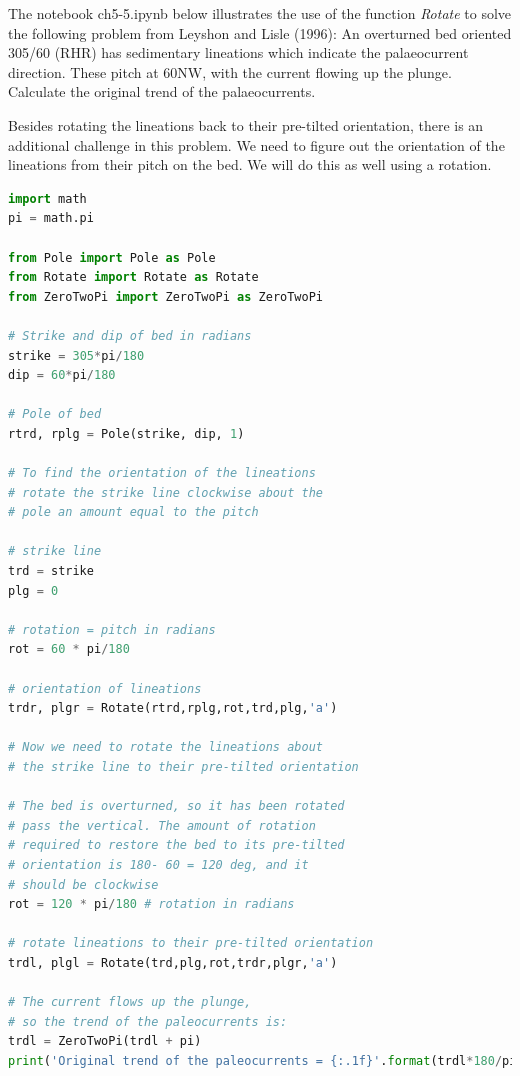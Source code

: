 \documentclass[a4paper , 12pt]{book}
\begin{document}
The  notebook  ch5-5.ipynb  below  illustrates  the  use  of  the  function \textit{Rotate} to solve the following problem from Leyshon  and Lisle  (1996): An overturned bed oriented 305/60 (RHR) has sedimentary lineations which indicate the palaeocurrent direction. These pitch at 60NW, with the current flowing up the plunge. Calculate the original trend of the palaeocurrents. 

Besides rotating the lineations back to their pre-tilted orientation, there is an additional challenge in this problem. We need to figure out the orientation of the lineations from their pitch on the bed. We will do this as well using a rotation.

\begin{center}
\begin{lstlisting}[language=Python, frame=single]
import math
pi = math.pi

from Pole import Pole as Pole
from Rotate import Rotate as Rotate
from ZeroTwoPi import ZeroTwoPi as ZeroTwoPi

# Strike and dip of bed in radians
strike = 305*pi/180
dip = 60*pi/180

# Pole of bed
rtrd, rplg = Pole(strike, dip, 1)

# To find the orientation of the lineations
# rotate the strike line clockwise about the 
# pole an amount equal to the pitch

# strike line
trd = strike 
plg = 0

# rotation = pitch in radians
rot = 60 * pi/180 

# orientation of lineations
trdr, plgr = Rotate(rtrd,rplg,rot,trd,plg,'a')

# Now we need to rotate the lineations about
# the strike line to their pre-tilted orientation

# The bed is overturned, so it has been rotated 
# pass the vertical. The amount of rotation
# required to restore the bed to its pre-tilted
# orientation is 180- 60 = 120 deg, and it
# should be clockwise
rot = 120 * pi/180 # rotation in radians

# rotate lineations to their pre-tilted orientation
trdl, plgl = Rotate(trd,plg,rot,trdr,plgr,'a')

# The current flows up the plunge, 
# so the trend of the paleocurrents is:
trdl = ZeroTwoPi(trdl + pi)
print('Original trend of the paleocurrents = {:.1f}'.format(trdl*180/pi))
\end{lstlisting}
\end{center}
\end{document}

